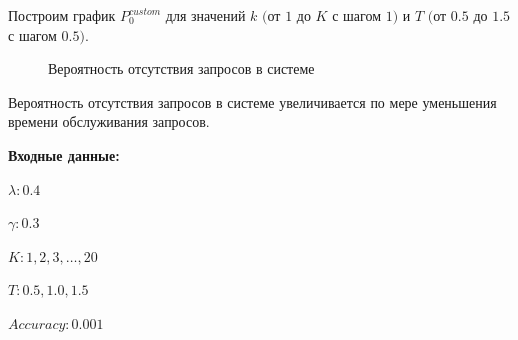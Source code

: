 \documentclass[12pt, a4paper]{article}
\begin{document}
Построим график $P_0^{custom}$ для значений $k$ $($от $1$ до $K$ с шагом $1)$ и  $T$ $($от $0.5$ до $1.5$  с шагом $0.5)$.
\begin{figure}[h]
	\caption{Вероятность отсутствия запросов в системе}
	\label{ris4}
\end{figure}


Вероятность отсутствия запросов в системе увеличивается по мере уменьшения времени обслуживания запросов.

\pagebreak
\textbf{Входные данные:}

$\lambda: 0.4$

$\gamma: 0.3$

$K: 1, 2, 3, \ldots, 20$

$T: 0.5, 1.0, 1.5$

$Accuracy: 0.001$
\end{document}
